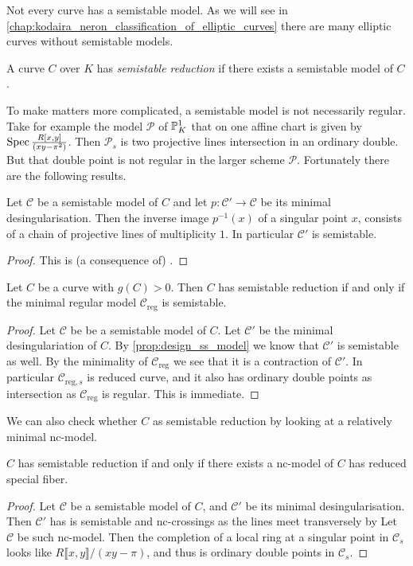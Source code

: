 Not every curve has a semistable model.
As we will see in \cref{chap:kodaira_neron_classification_of_elliptic_curves} there are many elliptic curves without semistable models. 
\begin{definition}
	A curve $C$ over $K$ has \emph{semistable reduction} if there exists a semistable model of $C$. 
\end{definition}
To make matters more complicated, a semistable model is not necessarily regular. 
Take for example the model $\mathscr P$ of $\mathbb{P}^{1}_K$ that on one affine chart is given by $\operatorname{Spec} \frac{R[x, y]}{(xy  - \pi^{2})}$. 
Then $\mathscr P_s$ is two projective lines intersection in an ordinary double.
But that double point is not regular in the larger scheme $\mathscr P$. 
Fortunately there are the following results. 
\begin{proposition}\label{prop:design_ss_model}
	Let $\mathscr C$ be a semistable model of $C$ and let $p:\mathscr C' \to \mathscr C$
	be its minimal desingularisation. 
	Then the inverse image $p^{-1}(x)$ of a singular point $x$, consists of a chain of projective lines of multiplicity $1$. 
	In particular $\mathscr C'$ is semistable. 
\end{proposition}
\begin{proof}
	This is (a consequence of) \cite[cor.\ 10.3.25]{liuAlgebraicGeometryArithmetic2002}.
\end{proof}
\begin{corollary}
	Let $C$ be a curve with  $g(C) > 0$.
	Then $C$ has semistable reduction if and only if the minimal regular model  $\mathscr C_\text{reg} $ is semistable. 
\end{corollary}
\begin{proof}
	\ltr Let $\mathscr C$ be be a semistable model of $C$. 
	Let $\mathscr C'$ be the minimal desingulariation of $C$. 
	By \cref{prop:design_ss_model} we know that  $\mathscr C'$ is semistable as well. 
	By the minimality of $\mathscr C_\text{reg} $ we see that it is a contraction of $\mathscr C'$. 
	In particular $\mathscr C_{\text{reg}, s}$ is reduced curve, and it also has ordinary double points as intersection as $\mathscr C_\text{reg} $ is regular.
	\rtl This is immediate. 
\end{proof}

We can also check whether $C$ as semistable reduction by looking at a relatively minimal nc-model. 
\begin{lemma}\label{lem:semistable_nc_model}
	$C$ has semistable reduction if and only if there exists a nc-model of  $C$ has reduced special fiber. 
\end{lemma}
\begin{proof}
	\ltr Let $ \mathscr C$ be a semistable model of $C$, and $\mathscr C'$ be its minimal desingularisation. 
	Then $\mathscr C'$ has is semistable and nc-crossings as the lines meet transversely by \cite[cor.\ 10.3.25]{liuAlgebraicGeometryArithmetic2002}
	\rtl Let  $\mathscr C$ be such nc-model. 
	Then the completion of a local ring at a singular point in $\mathscr C_s$ looks like $R\llbracket x, y \rrbracket /(xy - \pi)$, and thus is ordinary double points in $\mathscr C_s$.
\end{proof}



